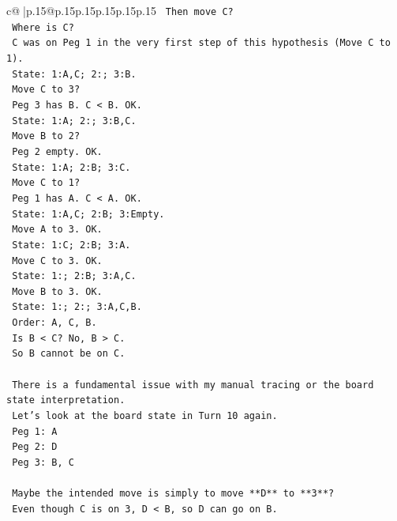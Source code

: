 \documentclass{article}
\begin{document}
{\begin{supertabular}{c@{$\;$}|p{.15\linewidth}@{}p{.15\linewidth}p{.15\linewidth}p{.15\linewidth}p{.15\linewidth}p{.15\linewidth}}
{{{\texttt{            Then move C?} \\
\texttt{            Where is C?} \\
\texttt{            C was on Peg 1 in the very first step of this hypothesis (Move C to 1).} \\
\texttt{            State: 1:A,C; 2:; 3:B.} \\
\texttt{            Move C to 3?} \\
\texttt{            Peg 3 has B. C < B. OK.} \\
\texttt{            State: 1:A; 2:; 3:B,C.} \\
\texttt{            Move B to 2?} \\
\texttt{            Peg 2 empty. OK.} \\
\texttt{            State: 1:A; 2:B; 3:C.} \\
\texttt{            Move C to 1?} \\
\texttt{            Peg 1 has A. C < A. OK.} \\
\texttt{            State: 1:A,C; 2:B; 3:Empty.} \\
\texttt{            Move A to 3. OK.} \\
\texttt{            State: 1:C; 2:B; 3:A.} \\
\texttt{            Move C to 3. OK.} \\
\texttt{            State: 1:; 2:B; 3:A,C.} \\
\texttt{            Move B to 3. OK.} \\
\texttt{            State: 1:; 2:; 3:A,C,B.} \\
\texttt{            Order: A, C, B.} \\
\texttt{            Is B < C? No, B > C.} \\
\texttt{            So B cannot be on C.} \\
\\ 
\texttt{            There is a fundamental issue with my manual tracing or the board state interpretation.} \\
\texttt{            Let's look at the board state in Turn 10 again.} \\
\texttt{            Peg 1: A} \\
\texttt{            Peg 2: D} \\
\texttt{            Peg 3: B, C} \\
\\ 
\texttt{            Maybe the intended move is simply to move **D** to **3**?} \\
\texttt{            Even though C is on 3, D < B, so D can go on B.} \\
}}}
\end{supertabular}}
\end{document}
